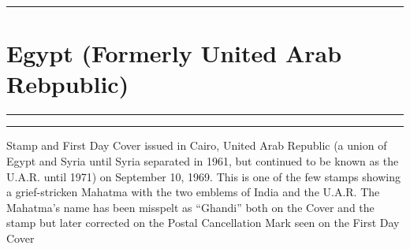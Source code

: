 \documentclass[a4paper]{article}
\begin{document}
  \hrule
\section*{Egypt {\small (Formerly United Arab Rebpublic)}}
\vspace{8pt}
\hrule
\vspace{12cm}
\hfill
\begin{minipage}{6cm}
  \hrule \vspace{12pt} Stamp and First Day Cover issued in Cairo,
  United Arab Republic (a union of Egypt and Syria until Syria
  separated in 1961, but continued to be known as the U.A.R. until
  1971) on September 10, 1969. This is one of the few stamps showing a
  grief-stricken Mahatma with the two emblems of India and the
  U.A.R. The Mahatma's name has been misspelt as ``Ghandi'' both on
  the Cover and the stamp but later corrected on the Postal
  Cancellation Mark seen on the First Day Cover
\end{minipage}

\end{document}

